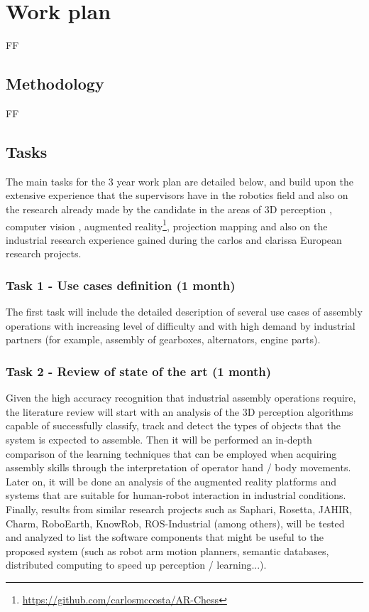 \chapter{Work plan}\label{chap:work-plan}

FF


\section{Methodology}

FF


\section{Tasks}

The main tasks for the 3 year work plan are detailed below, and build upon the extensive experience that the supervisors have in the robotics field and also on the research already made by the candidate in the areas of 3D perception \cite{Costa2015Diss,Costa2015ICIT,Costa2015Intech,Costa2016Elsevier}, computer vision \cite{Costa2014,Costa2016ICARSC}, augmented reality\footnote{\url{https://github.com/carlosmccosta/AR-Chess}}, projection mapping and also on the industrial research experience gained during the \gls{carlos} and \gls{clarissa} European research projects.



\subsection{Task 1 - Use cases definition (1 month)}

The first task will include the detailed description of several use cases of assembly operations with increasing level of difficulty and with high demand by industrial partners (for example, assembly of gearboxes, alternators, engine parts).


\subsection{Task 2 - Review of state of the art (1 month)}

Given the high accuracy recognition that industrial assembly operations require, the literature review will start with an analysis of the 3D perception algorithms capable of successfully classify, track and detect the types of objects that the system is expected to assemble. Then it will be performed an in-depth comparison of the learning techniques that can be employed when acquiring assembly skills through the interpretation of operator hand / body movements. Later on, it will be done an analysis of the augmented reality platforms and systems that are suitable for human-robot interaction in industrial conditions.
Finally, results from similar research projects such as Saphari, Rosetta, JAHIR, Charm, RoboEarth, KnowRob, ROS-Industrial (among others), will be tested and analyzed to list the software components that might be useful to the proposed system (such as robot arm motion planners, semantic databases, distributed computing to speed up perception / learning...).


